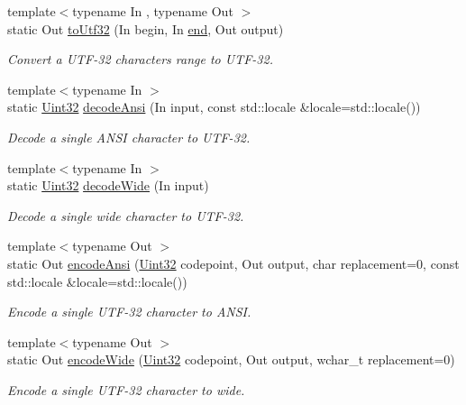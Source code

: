 \begin{DoxyCompactItemize}
{\footnotesize template$<$typename In , typename Out $>$ }\\static Out \hyperlink{classsf_1_1_utf_3_0132_01_4_abd7c1e80791c80c4d78257440de96140}{to\-Utf32} (In begin, In \hyperlink{gl3_8h_a432111147038972f06e049e18a837002}{end}, Out output)
\begin{DoxyCompactList}\small\item\em Convert a U\-T\-F-\/32 characters range to U\-T\-F-\/32. \end{DoxyCompactList}\item 
{\footnotesize template$<$typename In $>$ }\\static \hyperlink{namespacesf_aa746fb1ddef4410bddf198ebb27e727c}{Uint32} \hyperlink{classsf_1_1_utf_3_0132_01_4_a68346ea833f88267a7c739d4d96fb86f}{decode\-Ansi} (In input, const std\-::locale \&locale=std\-::locale())
\begin{DoxyCompactList}\small\item\em Decode a single A\-N\-S\-I character to U\-T\-F-\/32. \end{DoxyCompactList}\item 
{\footnotesize template$<$typename In $>$ }\\static \hyperlink{namespacesf_aa746fb1ddef4410bddf198ebb27e727c}{Uint32} \hyperlink{classsf_1_1_utf_3_0132_01_4_a043fe25f5f4dbc205e78e6f1d99840dc}{decode\-Wide} (In input)
\begin{DoxyCompactList}\small\item\em Decode a single wide character to U\-T\-F-\/32. \end{DoxyCompactList}\item 
{\footnotesize template$<$typename Out $>$ }\\static Out \hyperlink{classsf_1_1_utf_3_0132_01_4_af6590226a071076ca22d818573a16ded}{encode\-Ansi} (\hyperlink{namespacesf_aa746fb1ddef4410bddf198ebb27e727c}{Uint32} codepoint, Out output, char replacement=0, const std\-::locale \&locale=std\-::locale())
\begin{DoxyCompactList}\small\item\em Encode a single U\-T\-F-\/32 character to A\-N\-S\-I. \end{DoxyCompactList}\item 
{\footnotesize template$<$typename Out $>$ }\\static Out \hyperlink{classsf_1_1_utf_3_0132_01_4_a52e511e74ddc5df1bbf18f910193bc47}{encode\-Wide} (\hyperlink{namespacesf_aa746fb1ddef4410bddf198ebb27e727c}{Uint32} codepoint, Out output, wchar\-\_\-t replacement=0)
\begin{DoxyCompactList}\small\item\em Encode a single U\-T\-F-\/32 character to wide. \end{DoxyCompactList}\end{DoxyCompactItemize}


